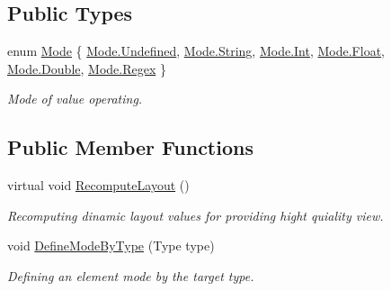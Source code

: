 \subsection*{Public Types}
\begin{DoxyCompactItemize}
\item 
enum \mbox{\hyperlink{class_wpf_handler_1_1_u_i_1_1_controls_1_1_text_field_control_a99939f3d8500812661376afa5ee1a31d}{Mode}} \{ \newline
\mbox{\hyperlink{class_wpf_handler_1_1_u_i_1_1_controls_1_1_text_field_control_a99939f3d8500812661376afa5ee1a31daec0fc0100c4fc1ce4eea230c3dc10360}{Mode.\+Undefined}}, 
\mbox{\hyperlink{class_wpf_handler_1_1_u_i_1_1_controls_1_1_text_field_control_a99939f3d8500812661376afa5ee1a31da27118326006d3829667a400ad23d5d98}{Mode.\+String}}, 
\mbox{\hyperlink{class_wpf_handler_1_1_u_i_1_1_controls_1_1_text_field_control_a99939f3d8500812661376afa5ee1a31da1686a6c336b71b36d77354cea19a8b52}{Mode.\+Int}}, 
\mbox{\hyperlink{class_wpf_handler_1_1_u_i_1_1_controls_1_1_text_field_control_a99939f3d8500812661376afa5ee1a31da22ae0e2b89e5e3d477f988cc36d3272b}{Mode.\+Float}}, 
\newline
\mbox{\hyperlink{class_wpf_handler_1_1_u_i_1_1_controls_1_1_text_field_control_a99939f3d8500812661376afa5ee1a31dad909d38d705ce75386dd86e611a82f5b}{Mode.\+Double}}, 
\mbox{\hyperlink{class_wpf_handler_1_1_u_i_1_1_controls_1_1_text_field_control_a99939f3d8500812661376afa5ee1a31da86f600672d32a7be1dd6cb035ac61577}{Mode.\+Regex}}
 \}
\begin{DoxyCompactList}\small\item\em Mode of value operating. \end{DoxyCompactList}\end{DoxyCompactItemize}
\subsection*{Public Member Functions}
\begin{DoxyCompactItemize}
\item 
virtual void \mbox{\hyperlink{class_wpf_handler_1_1_u_i_1_1_controls_1_1_text_field_control_aaf6c7c81a06ea18f7fd0b709fb9f26b3}{Recompute\+Layout}} ()
\begin{DoxyCompactList}\small\item\em Recomputing dinamic layout values for providing hight quiality view. \end{DoxyCompactList}\item 
void \mbox{\hyperlink{class_wpf_handler_1_1_u_i_1_1_controls_1_1_text_field_control_a0b8ff332028f0277379658e84edadbd7}{Define\+Mode\+By\+Type}} (Type type)
\begin{DoxyCompactList}\small\item\em Defining an element mode by the target type. \end{DoxyCompactList}\end{DoxyCompactItemize}
